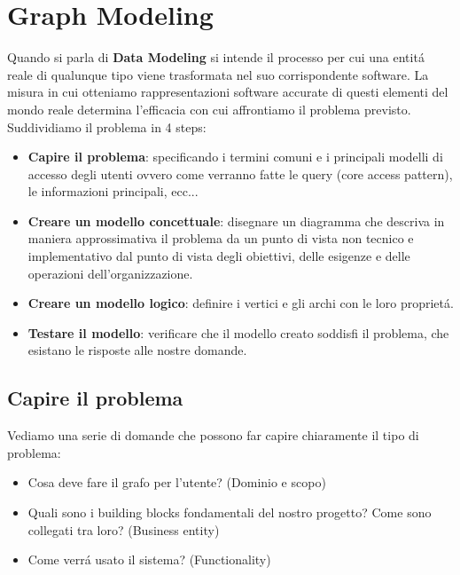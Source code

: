 \section{Graph Modeling}
Quando si parla di \textbf{Data Modeling} si intende il processo per cui una entitá reale di qualunque tipo viene trasformata nel suo corrispondente software. La misura in cui otteniamo rappresentazioni software accurate di questi elementi del mondo reale determina l'efficacia con cui affrontiamo il problema previsto. Suddividiamo il problema in 4 steps: 
\begin{itemize}
    \item \textbf{Capire il problema}: specificando i termini comuni e i principali modelli di accesso degli utenti ovvero come verranno fatte le query (core access pattern), le informazioni principali, ecc...
    \item \textbf{Creare un modello concettuale}: disegnare un diagramma che descriva in maniera approssimativa il problema da un punto di vista non tecnico e implementativo dal punto di vista degli obiettivi, delle esigenze e delle operazioni dell'organizzazione.
    \item \textbf{Creare un modello logico}: definire i vertici e gli archi con le loro proprietá.
    \item \textbf{Testare il modello}: verificare che il modello creato soddisfi il problema, che esistano le risposte alle nostre domande. 
\end{itemize}

\subsection{Capire il problema}
Vediamo una serie di domande che possono far capire chiaramente il tipo di problema:
\begin{itemize}
    \item Cosa deve fare il grafo per l'utente? (Dominio e scopo)
    \item Quali sono i building blocks fondamentali del nostro progetto? Come sono collegati tra loro? (Business entity)
    \item Come verrá usato il sistema? (Functionality)
\end{itemize}

